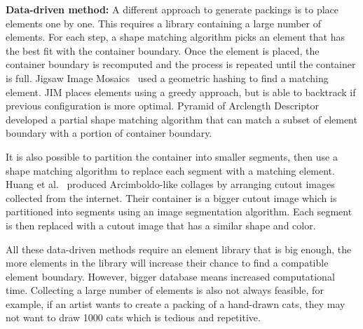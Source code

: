 \textbf{Data-driven method:} A different approach to generate packings is to
place elements one by one. This requires a library containing
a large number of elements. For each step, a shape matching algorithm
picks an element that has the best fit with the container boundary.
Once the element is placed, the container boundary is recomputed and
the process is repeated until the container is full.
Jigsaw Image Mosaics~\cite{Kim2002} used a geometric hashing to find
a matching element. JIM places elements using a greedy approach, but is able to backtrack 
if previous configuration is more optimal.
Pyramid of Arclength Descriptor~\cite{Kwan2016} developed
a partial shape matching algorithm that can match a subset of element boundary with a portion
of container boundary.

It is also possible to partition the container into smaller segments,
then use a shape matching algorithm to replace each segment with
a matching element.
Huang et al.~\cite{Huang2011} produced Arcimboldo-like collages
by arranging cutout images collected from the internet.
Their container is a bigger cutout image which is partitioned into segments
using an image segmentation algorithm.
Each segment is then replaced with a cutout image that has a similar shape and color.

All these data-driven methods require an element library that is big enough,
the more elements in the library will increase their chance to find a compatible element boundary.
However, bigger database means increased computational time.
Collecting a large number of elements is also not always feasible,
for example, if an artist wants to create a packing of a hand-drawn cats,
they may not want to draw 1000 cats which is tedious and repetitive.



